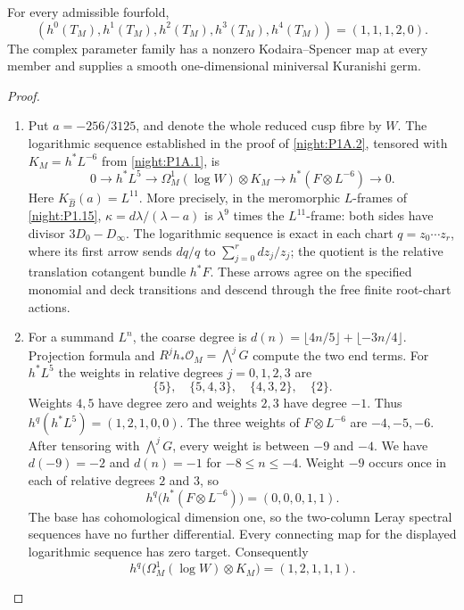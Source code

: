 \begin{theorem}\label{night:P1A.3}
For every admissible fourfold,
\[
 (h^0(T_M),h^1(T_M),h^2(T_M),h^3(T_M),h^4(T_M))
 =(1,1,1,2,0).
\]
The complex parameter family has a nonzero Kodaira--Spencer map
at every member and supplies a smooth one-dimensional miniversal
Kuranishi germ.
\end{theorem}
\begin{proof}
\begin{enumerate}[label=\arabic*.]
\item Put $a=-256/3125$, and denote the whole reduced cusp fibre by
$W$.  The logarithmic sequence established in the proof of
\cref{night:P1A.2}, tensored with $K_M=h^*L^{-6}$ from
\cref{night:P1A.1}, is
\[
0\longrightarrow h^*L^5
\longrightarrow\Omega^1_M(\log W)\otimes K_M
\longrightarrow h^*(F\otimes L^{-6})\longrightarrow0.
\]
Here $K_{\widehat B}(a)=L^{11}$.  More precisely, in the meromorphic
$L$-frames of \cref{night:P1.15},
$\kappa=d\lambda/(\lambda-a)$ is $\lambda^9$ times the
$L^{11}$-frame: both sides have divisor $3D_0-D_\infty$.
The logarithmic sequence is exact in each chart
$q=z_0\cdots z_r$, where its first arrow sends $dq/q$ to
$\sum_{j=0}^r dz_j/z_j$; the quotient is the relative translation
cotangent bundle $h^*F$.  These arrows agree on the specified
monomial and deck transitions and descend through the free finite
root-chart actions.

\item For a summand $L^n$, the coarse degree is
$d(n)=\lfloor4n/5\rfloor+\lfloor-3n/4\rfloor$.
Projection formula and
$R^jh_*\mathcal O_M=\bigwedge^jG$ compute the two end terms.
For $h^*L^5$ the weights in relative degrees $j=0,1,2,3$ are
\[
\{5\},\quad\{5,4,3\},\quad\{4,3,2\},\quad\{2\}.
\]
Weights $4,5$ have degree zero and weights $2,3$ have degree $-1$.
Thus $h^q(h^*L^5)=(1,2,1,0,0)$.
The three weights of $F\otimes L^{-6}$ are $-4,-5,-6$.
After tensoring with $\bigwedge^jG$, every weight is between
$-9$ and $-4$.  We have $d(-9)=-2$ and $d(n)=-1$ for
$-8\le n\le-4$.  Weight $-9$ occurs once in each of relative
degrees $2$ and $3$, so
\[
h^q\bigl(h^*(F\otimes L^{-6})\bigr)=(0,0,0,1,1).
\]
The base has cohomological dimension one, so the two-column Leray
spectral sequences have no further differential.  Every connecting
map for the displayed logarithmic sequence has zero target.
Consequently
\[
h^q\bigl(\Omega^1_M(\log W)\otimes K_M\bigr)=(1,2,1,1,1).
\]


\end{enumerate}
\end{proof}
